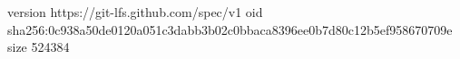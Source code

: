 version https://git-lfs.github.com/spec/v1
oid sha256:0c938a50de0120a051c3dabb3b02c0bbaca8396ee0b7d80c12b5ef958670709e
size 524384

